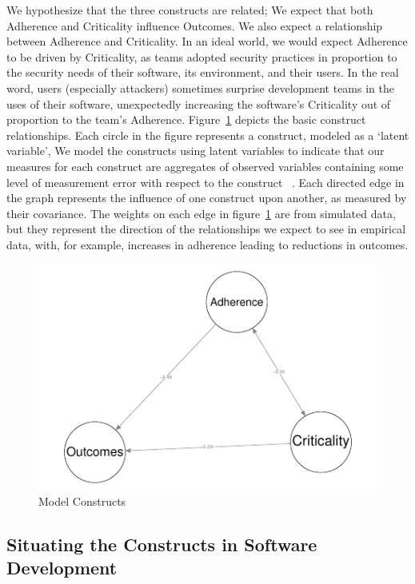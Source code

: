 We hypothesize that the three constructs are related; We expect that both Adherence and Criticality influence Outcomes.  We also expect a relationship between Adherence and Criticality.  In an ideal world, we would expect Adherence to be driven by Criticality, as teams adopted security practices in proportion to the security needs of their software, its environment, and their users. In the real word, users (especially attackers) sometimes surprise development teams in the uses of their software, unexpectedly increasing the software's Criticality out of proportion to the team's Adherence. Figure~\ref{fig:model_constructs} depicts the basic construct relationships. Each circle in the figure represents a construct, modeled as a `latent variable', We model the constructs using latent variables to indicate that our measures for each construct are aggregates of observed variables containing some level of measurement error with respect to the construct ~\cite{kline2015principles,borsboom2008latent}. Each directed edge in the graph represents the influence of one construct upon another, as measured by their covariance. The weights on each edge in figure~\ref{fig:model_constructs} are from simulated data, but they represent the direction of the relationships we expect to see in empirical data, with, for example, increases in adherence leading to reductions in outcomes. 

\begin{figure}
		\includegraphics[width=\columnwidth]{modelzero}
	\caption{Model Constructs}
	\label{fig:model_constructs}
\end{figure}

\subsection{Situating the Constructs in Software Development}

